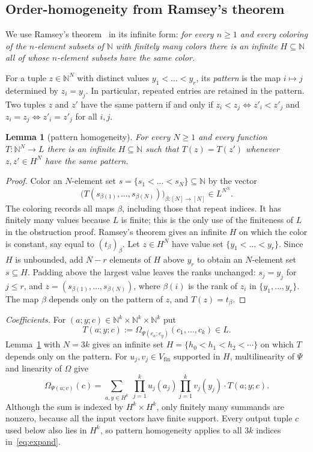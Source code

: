 \documentclass[11pt]{amsart}
\newtheorem{lemma}[theorem]{Lemma}
\theoremstyle{definition}
\theoremstyle{remark}
\numberwithin{equation}{section}
\newcommand{\N}{\mathbb N}
\begin{document}
\subsection{Order-homogeneity from Ramsey's theorem}
We use Ramsey's theorem~\cite{Ra} in its infinite form: \emph{for every $n\ge1$ and every coloring of the
$n$\nobreakdash-element subsets of $\N$ with finitely many colors there is an infinite $H\subseteq\N$ all of whose $n$\nobreakdash-element
subsets have the same color.}

For a tuple $z\in\N^N$ with distinct values $y_1<\dots<y_r$, its \emph{pattern} is the map
$i\mapsto j$ determined by $z_i=y_j$. In particular, repeated entries are retained in the pattern. Two tuples $z$
and $z'$ have the same pattern if and only if $z_i<z_j\Leftrightarrow z'_i<z'_j$ and $z_i=z_j\Leftrightarrow z'_i=z'_j$ for
all $i,j$.

\begin{lemma}[pattern homogeneity]\label{lem:H}
For every $N\ge1$ and every function $T\colon\N^N\to L$ there is an infinite $H\subseteq\N$ such that $T(z)=T(z')$
whenever $z,z'\in H^N$ have the same pattern.
\end{lemma}

\begin{proof}
Color an $N$\nobreakdash-element set $s=\{s_1<\dots<s_N\}\subseteq\N$ by the vector
\[
\bigl(T(s_{\beta(1)},\dots,s_{\beta(N)})\bigr)_{\beta\colon[N]\to[N]}\in L^{N^N}.
\]
The coloring records all maps $\beta$, including those that repeat indices. It has finitely many values because
$L$ is finite; this is the only use of the finiteness of $L$ in the obstruction proof. Ramsey's theorem gives an
infinite $H$ on which the color is constant, say equal to $(t_\beta)_\beta$. Let $z\in H^N$ have value set
$\{y_1<\dots<y_r\}$. Since $H$ is unbounded, add $N-r$ elements of $H$ above $y_r$ to obtain an
$N$\nobreakdash-element set $s\subseteq H$. Padding above the largest value leaves the ranks unchanged: $s_j=y_j$ for
$j\le r$, and
$z=(s_{\beta(1)},\dots,s_{\beta(N)})$, where $\beta(i)$ is the rank of $z_i$ in $\{y_1,\dots,y_r\}$. The map $\beta$
depends only on the pattern of $z$, and $T(z)=t_\beta$.
\end{proof}

\emph{Coefficients.} For $(a;y;c)\in\N^k\times\N^k\times\N^k$ put
\[
T(a;y;c):=\Omega_{\Psi(e_a;e_y)}(c_1,\dots,c_k)\in L .
\]
Lemma~\ref{lem:H} with $N=3k$ gives an infinite set $H=\{h_0<h_1<h_2<\cdots\}$ on which $T$ depends only on the pattern.
For $u_j,v_j\in V_{\mathrm{fin}}$ supported in $H$, multilinearity of $\Psi$ and linearity of $\Omega$ give
\begin{equation}\label{eq:expand}
\Omega_{\Psi(u;v)}(c)=\sum_{a,y\in H^k}\ \prod_{j=1}^ku_j(a_j)\prod_{j=1}^kv_j(y_j)\cdot T(a;y;c).
\end{equation}
Although the sum is indexed by $H^k\times H^k$, only finitely many summands are nonzero, because all the input
vectors have finite support. Every output tuple $c$ used below also lies in $H^k$, so pattern homogeneity applies to
all $3k$ indices in~\eqref{eq:expand}.
\end{document}
